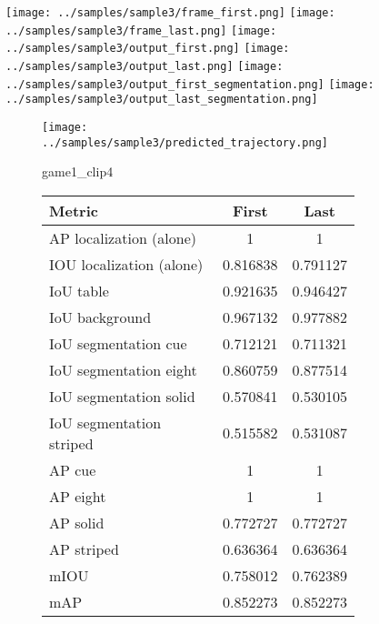 \begin{figure}
    \texttt{[image: ../samples/sample3/frame\_first.png]}
    \texttt{[image: ../samples/sample3/frame\_last.png]}
    \newline
    \texttt{[image: ../samples/sample3/output\_first.png]}
    \texttt{[image: ../samples/sample3/output\_last.png]}
    \newline
    \texttt{[image: ../samples/sample3/output\_first\_segmentation.png]}
    \texttt{[image: ../samples/sample3/output\_last\_segmentation.png]}
    \newline
    \begin{subfigure}[b]{0.49\textwidth}
        \vspace{20pt}
        \texttt{[image: ../samples/sample3/predicted\_trajectory.png]}
        \caption*{game1\_clip4}
    \end{subfigure}
\begin{subfigure}[b]{0.49\textwidth}
    \begin{tabular}{|l|c|c|}
        \hline
        \textbf{Metric} & \textbf{First} & \textbf{Last} \\
        \hline
        AP localization (alone) & 1 & 1 \\ 
        IOU localization (alone) & 0.816838 & 0.791127 \\ 
        \hline
        IoU table & 0.921635 & 0.946427 \\ 
        IoU background & 0.967132 & 0.977882 \\ 
        \hline
        IoU segmentation cue & 0.712121 & 0.711321 \\ 
        IoU segmentation eight & 0.860759 & 0.877514 \\ 
        IoU segmentation solid & 0.570841 & 0.530105 \\ 
        IoU segmentation striped & 0.515582 & 0.531087 \\ 
        \hline
        AP cue & 1 & 1 \\ 
        AP eight & 1 & 1 \\ 
        AP solid & 0.772727 & 0.772727 \\ 
        AP striped & 0.636364 & 0.636364 \\ 
        \hline
        mIOU & 0.758012 & 0.762389 \\ 
        mAP & 0.852273 & 0.852273 \\ 
        \hline
    \end{tabular}    
\end{subfigure}
\end{figure}

